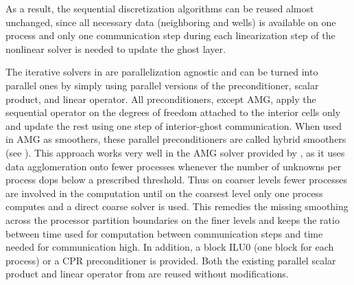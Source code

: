 
As a result, the sequential discretization algorithms can be reused almost unchanged,
since all necessary data (neighboring and wells) is available on one process and only one
communication step during each linearization step of the nonlinear solver is needed to
update the ghost layer.

The iterative solvers in \duneistl are parallelization
agnostic and can be turned into parallel ones by
simply using parallel versions of the preconditioner, scalar product,
and linear operator. All preconditioners, except
AMG, apply the sequential operator on the degrees of freedom
attached to the interior cells only and update the rest using one
step of interior-ghost communication. When used in AMG as smoothers, these
parallel preconditioners are called hybrid smoothers
(see \cite{hybrid}). This approach works very well in the AMG solver provided by
\duneistl \cite{blattamg}, as it uses data agglomeration onto fewer
processes whenever the number of unknowns per process dops below a
prescribed threshold. Thus on coarser levels fewer processes are
involved in the computation until on the coarsest level only one process computes
and a direct coarse solver is used. This remedies the missing
smoothing across the processor partition boundaries on
the finer levels and keeps the ratio between time used for computation between
communication steps and time needed for communication high. 
In addition, a block ILU0 (one block for each process) or a CPR preconditioner is provided. 
%
Both the existing parallel scalar product
and linear operator from \duneistl are reused without modifications.

